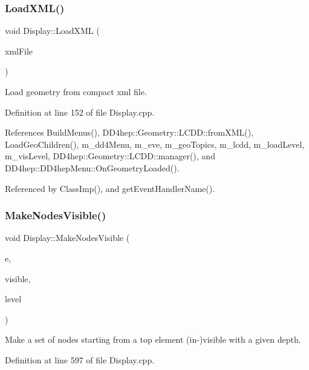 \subsubsection{\texorpdfstring{Load\+X\+M\+L()}{LoadXML()}}
{\footnotesize\ttfamily void Display\+::\+Load\+X\+ML (\begin{DoxyParamCaption}\item[{const char $\ast$}]{xml\+File }\end{DoxyParamCaption})}



Load geometry from compact xml file. 



Definition at line 152 of file Display.\+cpp.



References Build\+Menus(), D\+D4hep\+::\+Geometry\+::\+L\+C\+D\+D\+::from\+X\+M\+L(), Load\+Geo\+Children(), m\+\_\+dd4\+Menu, m\+\_\+eve, m\+\_\+geo\+Topics, m\+\_\+lcdd, m\+\_\+load\+Level, m\+\_\+vis\+Level, D\+D4hep\+::\+Geometry\+::\+L\+C\+D\+D\+::manager(), and D\+D4hep\+::\+D\+D4hep\+Menu\+::\+On\+Geometry\+Loaded().



Referenced by Class\+Imp(), and get\+Event\+Handler\+Name().

\hypertarget{class_d_d4hep_1_1_display_a7d6adb53b1895ebb1133b4e5bbb1d6d4}{}\label{class_d_d4hep_1_1_display_a7d6adb53b1895ebb1133b4e5bbb1d6d4} 
\subsubsection{\texorpdfstring{Make\+Nodes\+Visible()}{MakeNodesVisible()}}
{\footnotesize\ttfamily void Display\+::\+Make\+Nodes\+Visible (\begin{DoxyParamCaption}\item[{T\+Eve\+Element $\ast$}]{e,  }\item[{bool}]{visible,  }\item[{int}]{level }\end{DoxyParamCaption})}



Make a set of nodes starting from a top element (in-\/)visible with a given depth. 



Definition at line 597 of file Display.\+cpp.



